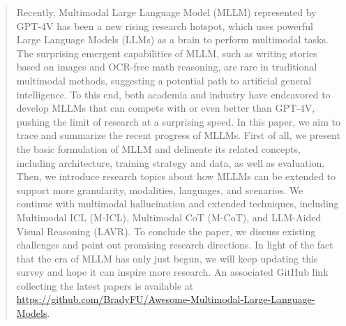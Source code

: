 \justify
\begin{abstract}
Recently, Multimodal Large Language Model (MLLM) represented by GPT-4V has been a new rising research hotspot, which uses powerful Large Language Models (LLMs) as a brain to perform multimodal tasks. 
The surprising emergent capabilities of MLLM, such as writing stories based on images and OCR-free math reasoning, are rare in traditional multimodal methods, suggesting a potential path to artificial general intelligence.
To this end, both academia and industry have endeavored to develop MLLMs that can compete with or even better than GPT-4V, pushing the limit of research at a surprising speed.
In this paper, we aim to trace and summarize the recent progress of MLLMs.
First of all, we present the basic formulation of MLLM and delineate its related concepts, including architecture, training strategy and data, as well as evaluation.
Then, we introduce research topics about how MLLMs can be extended to support more granularity, modalities, languages, and scenarios. 
We continue with multimodal hallucination and extended techniques, including Multimodal ICL (M-ICL), Multimodal CoT (M-CoT), and LLM-Aided Visual Reasoning (LAVR). 
To conclude the paper, we discuss existing challenges and point out promising research directions. 
In light of the fact that the era of MLLM has only just begun, we will keep updating this survey and hope it can inspire more research.
An associated GitHub link collecting the latest papers is available at \url{https://github.com/BradyFU/Awesome-Multimodal-Large-Language-Models}.
\end{abstract}

